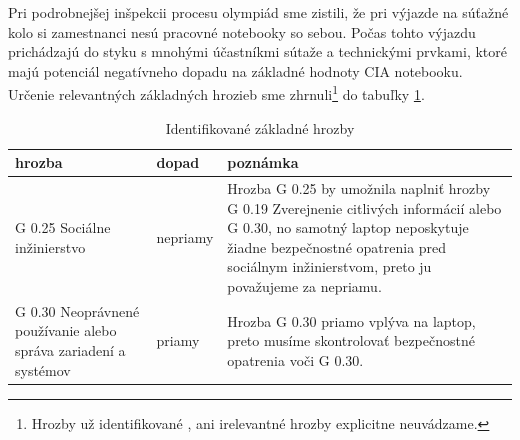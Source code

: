 Pri podrobnejšej inšpekcii procesu olympiád sme zistili, že pri výjazde na súťažné kolo si zamestnanci nesú pracovné notebooky so sebou.
Počas tohto výjazdu prichádzajú do styku s mnohými účastníkmi sútaže a technickými prvkami, ktoré majú potenciál negatívneho dopadu na
základné hodnoty CIA notebooku. Určenie relevantných základných hrozieb sme zhrnuli\footnote{Hrozby už identifikované \cite{GSK}, ani
irelevantné hrozby explicitne neuvádzame.} do tabuľky \ref{tab:elemthreatid}.
\begin{table}[h!]
    \caption{Identifikované základné hrozby}
    \label{tab:elemthreatid}
    \begin{center}
        \footnotesize
        \begin{tabular}{ |p{}|p{}|p{}| }
        \hline
        hrozba & dopad & poznámka \\
        \hline
        \hline
        G 0.25 Sociálne inžinierstvo & nepriamy & Hrozba G 0.25 by umožnila naplniť hrozby G 0.19 Zverejnenie citlivých informácií alebo G 0.30,
        no samotný laptop neposkytuje žiadne bezpečnostné opatrenia pred sociálnym inžinierstvom, preto ju považujeme za nepriamu.  \\
        \hline
        G 0.30 Neoprávnené používanie alebo správa zariadení a systémov & priamy &  Hrozba G 0.30 priamo vplýva na laptop, preto musíme
        skontrolovať bezpečnostné opatrenia voči G 0.30.\\
        \hline
        \end{tabular}
    \end{center}
\end{table}

